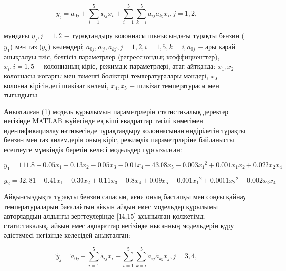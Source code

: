 \begin{equation}
    y_j = a_{0j} + \sum_{i=1}^5 {a_{ij}x_{i} + \sum_{i=1}^5\sum_{k=i}^5 {a_{ij}}{a_{kj}x_i, j=1,2,}} 
\end{equation}	

\begin{multicols}{2}
мұндағы $y_j, j=1,2$ − тұрақтандыру колоннасы шығысындағы тұрақты
бензин ($y_1$) мен газ ($y_2$) көлемдері; $a_{0j}, a_{ij}, a_{kj},
j=1,2, i=1,5, k=i, a_{0j}$ − ары қарай анықталуы тиіс, белгісіз
параметрлер (регрессиондық коэффициенттер), $x_i, i=\overline{1,5}$ −
колоннаның кіріс, режимдік параметрлері, атап айтқанда: $x_1, x_2$ −
колоннасы жоғарғы мен төменгі бөліктері температуралары мәндері, $
x_3$ − колонна кірісіндегі шикізат көлемі, $x_4,x_5$ − шикізат
температурасы мен тығыздығы.

Анықталған (1) модель құрылымын параметрлерін статистикалық деректер
негізінде MATLAB жүйесінде ең кіші квадраттар тәсілі көмегімен
идентификациялау нәтижесінде тұрақтандыру колоннасынан өндірілетін
тұрақты бензин мен газ көлемдерін оның кіріс, режимдік параметрлеріне
байланысты есептеуге мүмкіндік беретін келесі модельдер тұрғызылған:
\end{multicols}

\begin{equation}
y_1=111.8 - 0.05x_1 +0.13x_2 - 0.05x_3 - 0.01x_4 - 43.08x_5 - 0.003{x_1}^2 +0.001x_1x_2 +0.022x_2x_4 
\end{equation}

\begin{equation}
y_2 = 32,81 - 0.41x_1 - 0.30x_2 +0.11x_3 -0.8x_4 +0.09x_5 - 0.001{x_1}^2 +0.0001{x_2}^2	- 0.002{x_2x_4}
\end{equation}

\begin{multicols}{2}
Айқынсыздықта тұрақты бензин сапасын, яғни оның бастапқы мен соңғы
қайнау температураларын бағалайтын айқын айқын емес модельдер құрылымы
авторлардың алдыңғы зерттеулерінде {[}14,15{]} ұсынылған қолжетімді
статистикалық, айқын емес ақпараттар негізінде нысанның модельдерін құру
әдістемесі негізінде келесідей анықталған:
\end{multicols}

\begin{equation}
\tilde{y}_j=\tilde{a}_{0j}+\sum_{i=1}^5\tilde{a}_{ij}x_i+\sum_{i=1}^5\sum_{k=i}^5\tilde{a}_{ij}\tilde{a}_{kj}x_j,j=3,4,
\end{equation}


